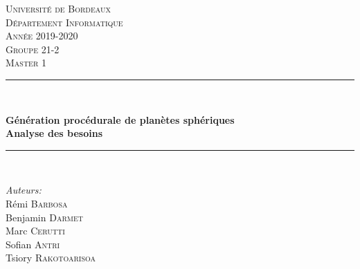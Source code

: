 \documentclass[a4paper]{article}
\begin{document}
\newcommand{\customlarge}[1]{\noindent \Large{\textbf{#1}}}
\newcommand{\customitalic}[1]{\large{\textbf{\textit{#1}}}}
\newcommand{\avis}[2]{\customlarge{Avis personnel -} \customitalic{#1} \\ #2\\[0.8cm]}
\newcommand*{\escape}[1]{\texttt{\textbackslash#1}}

\newcommand{\customquote}[1]{\guillemotleft {#1} \guillemorright~}

\begin{titlepage}
\newcommand{\HRule}{\rule{\linewidth}{0.5mm}} %

\center %
 

\textsc{\LARGE Université de Bordeaux}\\[0.5cm]
\textsc{\large Département Informatique}\\[0.5cm]
\textsc{\large Année 2019-2020}\\[1.5cm]
\textsc{\Large Groupe 21-2}\\[0.2cm] 
\textsc{\large Master 1}\\[0.3cm] 


\HRule \\[0.4cm]
{ \huge \bfseries Génération procédurale de planètes sphériques\\[0.4cm] 
   \Large \bfseries Analyse des besoins
\HRule \\[1.5cm]
 

\begin{minipage}{0.4\textwidth}
\begin{center} \large
\emph{Auteurs:}\\
Rémi \textsc{Barbosa}\\
Benjamin \textsc{Darmet}\\
Marc \textsc{Cerutti}\\
Sofian \textsc{Antri}\\
Tsiory \textsc{Rakotoarisoa}\\


\end{center}
\end{minipage}}
\end{titlepage}
\end{document}

